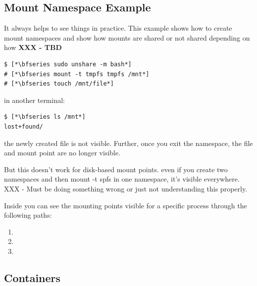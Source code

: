
\subsection{Mount Namespace Example}

It always helps to see things in practice. This example shows how to create mount namespaces and show how mounts are shared or not shared depending on how \textbf{XXX - TBD}

\begin{lstlisting}
$ [*\bfseries sudo unshare -m bash*]
# [*\bfseries mount -t tmpfs tmpfs /mnt*]
# [*\bfseries touch /mnt/file*]
\end{lstlisting}

\noindent
in another terminal:

\begin{lstlisting}
$ [*\bfseries ls /mnt*]
lost+found/
\end{lstlisting}

\noindent
the newly created file is not visible. Further, once you exit the namespace, the file and mount point are no longer visible.

But this doesn't work for disk-based mount points. even if you create two namespaces and then mount -t spfs in one namespace, it's visible everywhere. XXX - Must be doing something wrong or just not understanding this properly.

Inside  you can see the mounting points visible for a specific process through the following paths:

\begin{enumerate}
	\item {}
	\item {}
	\item {}
\end{enumerate}


\subsection{Containers}


